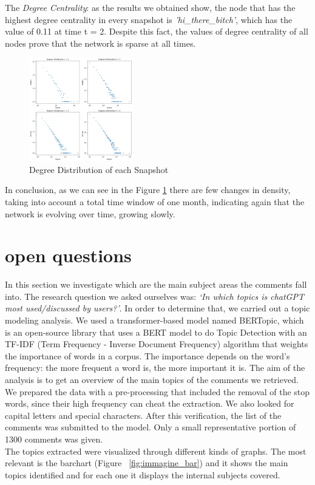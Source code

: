 \documentclass[sigchi]{acmart}
\begin{document}
\noindent The \textit{Degree Centrality}: as the results we obtained show, the node that has the highest degree centrality in every snapshot is \textit{'hi\_there\_bitch'}, which has the value of 0.11 at time t = 2. Despite this fact, the values of degree centrality of all nodes prove that the network is sparse at all times.

\begin{figure}[!ht]
  \centering
  \includegraphics[width=0.4\textwidth]{img/dd_snapshot.png}
  \caption{Degree Distribution of each Snapshot}
  \label{fig:Degree Distribution Snapshot}
\end{figure}


In conclusion, as we can see in the Figure \ref{fig:Degree Distribution Snapshot} there are few changes in density, taking into account a total time window of one month, indicating again that the network is evolving over time, growing slowly.

\section{open questions}
In this section we investigate which are the main subject areas the comments fall into. The research question we asked ourselves was: \textit{`In which topics is chatGPT most used/discussed by users?'}. In order to determine that, we carried out a topic modeling analysis. We used a transformer-based model named BERTopic, which is an open-source library that uses a BERT model to do Topic Detection with an TF-IDF (Term Frequency - Inverse Document Frequency) algorithm that weights the importance of words in a corpus. The importance depends on the word's frequency: the more frequent a word is, the more important it is. The aim of the analysis is to get an overview of the main topics of the comments we retrieved.\\

We prepared the data with a pre-processing that included the removal of the stop words, since their high frequency can cheat the extraction. We also looked for capital letters and special characters. After this verification, the list of the comments was submitted to the model. 
Only a small representative portion of 1300 comments was given. \\ The topics extracted were visualized through different kinds of graphs. The most relevant is the barchart (Figure ~\ref{fig:immagine_bar}) and it shows the main topics identified and for each one it displays the internal subjects covered. 
\end{document}
